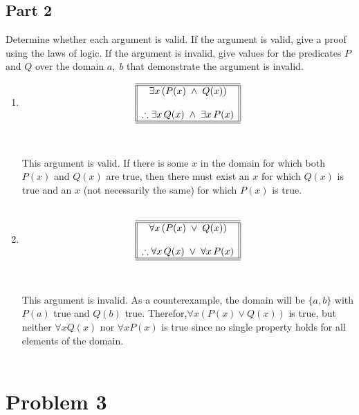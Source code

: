 \documentclass{amsart}
\theoremstyle{definition}
\theoremstyle{Exercise}
\theoremstyle{remark}
\theoremstyle{rule}
\numberwithin{equation}{section}
\begin{document}
 \subsection*{Part 2}
Determine whether each argument is valid. If the argument is valid, give a proof using the laws of logic. If the argument is invalid, give values for the predicates $P$ and $Q$ over the domain ${a,\; b}$ that demonstrate the argument is invalid.\\
 \begin{enumerate}[label=(\alph*)]
\item \[
\begin{array}{||c||}
\hline \hline
\exists x\, (P(x)\; \land \;Q(x) )\\
\\
\therefore \exists x\, Q(x)\; \land\; \exists x \,P(x) \\
\hline \hline
\end{array}
\]\\\\
 This argument is valid. If there is some \( x \) in the domain for which both \( P(x) \) and \( Q(x) \) are true, then there must exist an \( x \) for which \( Q(x) \) is true and an \( x \) (not necessarily the same) for which \( P(x) \) is true.
 \\\\


\item \[
\begin{array}{||c||}
\hline \hline
\forall x\, (P(x)\; \lor \;Q(x) )\\
\\
\therefore \forall x\, Q(x)\; \lor \; \forall x\, P(x) \\
\hline \hline
\end{array}
\]\\\\
 This argument is invalid. As a counterexample, the domain will be \( \{a, b\} \) with \( P(a) \) true and \( Q(b) \) true. Therefor,\( \forall x (P(x) \lor Q(x)) \) is true, but neither \( \forall x Q(x) \) nor \( \forall x P(x) \) is true since no single property holds for all elements of the domain.
 \\\\
 \end{enumerate}
 \newpage


\section*{Problem 3}
\end{document}
